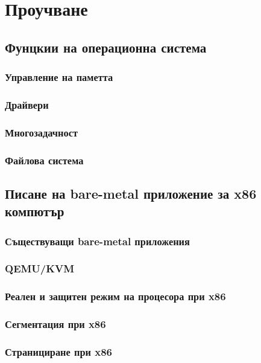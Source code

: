 \chapter{Проучване} %
\hfill
\section{Фунцкии на операционна система}
  \subsection{Управление на паметта}

  \subsection{Драйвери}

  \subsection{Многозадачност}

  \subsection{Файлова система}

\section{Писане на bare-metal приложение за x86 компютър}
  \subsection{Съществуващи bare-metal приложения}

  \subsection{QEMU/KVM}

  \subsection{Реален и защитен режим на процесора при x86}

  \subsection{Сегментация при x86}

  \subsection{Странициране при x86}

